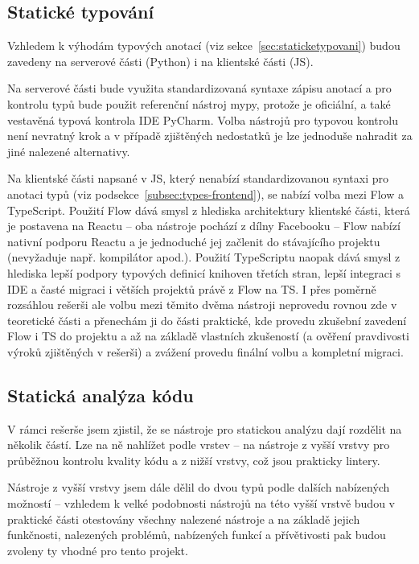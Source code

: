 \subsection{Statické typování}

Vzhledem k výhodám typových anotací (viz sekce~\ref{sec:staticketypovani}) budou zavedeny na serverové části (Python) i na klientské části (JS).

Na serverové části bude využita standardizovaná syntaxe zápisu anotací a pro kontrolu typů bude použit referenční nástroj mypy, protože je oficiální, a také vestavěná typová kontrola IDE PyCharm. Volba nástrojů pro typovou kontrolu není nevratný krok a v případě zjištěných nedostatků je lze jednoduše nahradit za jiné nalezené alternativy.

Na klientské části napsané v JS, který nenabízí standardizovanou syntaxi pro anotaci typů (viz podsekce~\ref{subsec:types-frontend}), se nabízí volba mezi Flow a TypeScript. Použití Flow dává smysl z hlediska architektury klientské části, která je postavena na Reactu -- oba nástroje pochází z dílny Facebooku -- Flow nabízí nativní podporu Reactu a je jednoduché jej začlenit do stávajícího projektu (nevyžaduje např. kompilátor apod.). Použití TypeScriptu naopak dává smysl z hlediska lepší podpory typových definicí knihoven třetích stran, lepší integraci s IDE a časté migraci i větších projektů právě z Flow na TS. I přes poměrně rozsáhlou rešerši ale volbu mezi těmito dvěma nástroji neprovedu rovnou zde v teoretické části a přenechám ji do části praktické, kde provedu zkušební zavedení Flow i TS do projektu a až na základě vlastních zkušeností (a ověření pravdivosti výroků zjištěných v rešerši) a zvážení provedu finální volbu a kompletní migraci.

\subsection{Statická analýza kódu}

V rámci rešerše jsem zjistil, že se nástroje pro statickou analýzu dají rozdělit na několik částí. Lze na ně nahlížet podle vrstev -- na nástroje z vyšší vrstvy pro průběžnou kontrolu kvality kódu a z nižší vrstvy, což jsou prakticky lintery.

Nástroje z vyšší vrstvy jsem dále dělil do dvou typů podle dalších nabízených možností -- vzhledem k velké podobnosti nástrojů na této vyšší vrstvě budou v praktické části otestovány všechny nalezené nástroje a na základě jejich funkčnosti, nalezených problémů, nabízených funkcí a přívětivosti pak budou zvoleny ty vhodné pro tento projekt.

